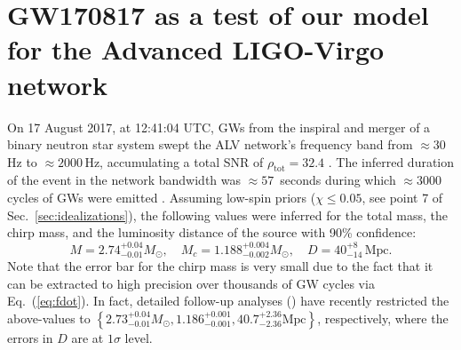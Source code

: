 \documentclass[prd,amsmath,amssymb,aps,floats,amsfonts,notitlepage,superscriptaddress,eqsecnum,nofootinbib,10pt]{revtex4-1}
\newcommand{\be}{\begin{equation}}
\newcommand{\ee}{\end{equation}}
\begin{document}
\section{GW170817 as a test of our model for the Advanced LIGO-Virgo network}\label{sec:GW170817}
On 17 August 2017, at 12:41:04 UTC, GWs from the inspiral and merger of a binary neutron star system %
swept the ALV network's frequency band from $\approx 30\,$Hz to $\approx 2000\,$Hz, accumulating a total SNR of
$\rho_\text{tot} = 32.4$ \cite{GW170817}.
The inferred duration of the event in the network bandwidth was $\approx 57\,$ seconds during which $\approx 3000$ cycles of GWs were emitted \cite{GW170817_Facts}.
Assuming low-spin priors  ($\chi \le 0.05$, see point 7 of Sec.~\ref{sec:idealizations}), the following values were inferred for the total mass, the chirp mass,
and the luminosity distance of the source with 90\% confidence:
%
\be
M = 2.74^{+0.04}_{-0.01} M_\odot,\quad M_c = 1.188^{+0.004}_{-0.002} M_\odot,\quad D= 40^{+8}_{-14}\,\text{Mpc}. \label{eq:GW170817_params}
\ee
%
Note that the error bar for the chirp mass is very small
due to the fact that it can be extracted to high precision over thousands of GW cycles via Eq.~(\ref{eq:fdot}). In fact, detailed follow-up analyses (\cite{GW170817_2018}) have recently restricted the above-values to
%
$ \left\{2.73^{+0.04}_{-0.01} M_\odot, 1.186^{+0.001}_{-0.001} ,  40.7^{+2.36}_{-2.36}\text{Mpc}\right\}$, respectively,
%
where the errors in $D$ are at $1\sigma$ level.
\end{document}
